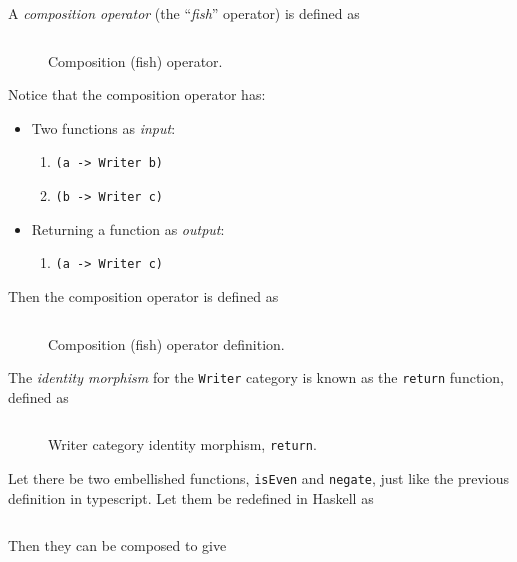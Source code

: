\begin{definition}
    A \textit{composition operator} (the \enquote{\textit{fish}} operator) is defined as
    \begin{figure}[H]
        \centering
        \inputminted{hs}{content/code-listings/fish.hs}
        \caption{Composition (fish) operator.}
        \label{fig:fish-operator}
    \end{figure}
    
    Notice that the composition operator has:
    \begin{itemize}
        \item Two functions as \textit{input}:
        \begin{enumerate}
            \item \texttt{(a -> Writer b)}
            \item \texttt{(b -> Writer c)}
        \end{enumerate}
        \item Returning a function as \textit{output}:
        \begin{enumerate}
            \item \texttt{(a -> Writer c)}
        \end{enumerate}
    \end{itemize}
    
    Then the composition operator is defined as
    \begin{figure}[H]
        \centering
        \inputminted{hs}{content/code-listings/fish-def.hs}
        \caption{Composition (fish) operator definition.}
        \label{fig:fish-definition}
    \end{figure}
\end{definition}

\begin{definition}
    The \textit{identity morphism} for the \texttt{Writer} category is known as the \texttt{return} function, defined as
    \begin{figure}[H]
        \centering
        \inputminted{hs}{content/code-listings/return.hs}
        \caption{Writer category identity morphism, \texttt{return}.}
        \label{fig:return-writer}
    \end{figure}
\end{definition}

\begin{example}
    Let there be two embellished functions, \texttt{isEven} and \texttt{negate}, just like the previous definition in typescript. Let them be redefined in Haskell as
    \inputminted{hs}{content/code-listings/embellished-functions-iseven-negate.hs}
    
    Then they can be composed to give
    \inputminted{hs}{content/code-listings/embellished-composition-isodd.hs}
\end{example}

